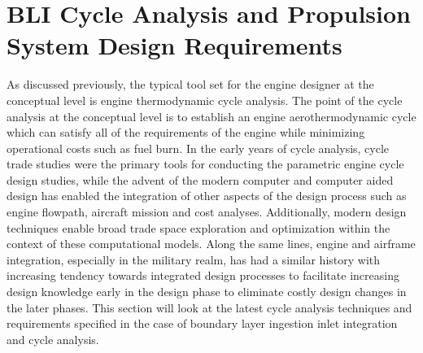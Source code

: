 \documentclass[12pt]{gatech-thesis}
\begin{document}
\section{BLI Cycle Analysis and Propulsion System Design Requirements}
	As discussed previously, the typical tool set for the engine designer at the conceptual level is engine thermodynamic cycle analysis.  The point of the cycle analysis at the conceptual level is to establish an engine aerothermodynamic cycle which can satisfy all of the requirements of the engine while minimizing operational costs such as fuel burn.  In the early years of cycle analysis, cycle trade studies were the primary tools for conducting the parametric engine cycle design studies, while the advent of the modern computer and computer aided design has enabled the integration of other aspects of the design process such as engine flowpath, aircraft mission and cost analyses.  Additionally, modern design techniques enable broad trade space exploration and optimization within the context of these computational models.  Along the same lines, engine and airframe integration, especially in the military realm, has had a similar history with increasing tendency towards integrated design processes to facilitate increasing design knowledge early in the design phase to eliminate costly design changes in the later phases.  This section will look at the latest cycle analysis techniques and requirements specified in the case of boundary layer ingestion inlet integration and cycle analysis.  
\end{document}
